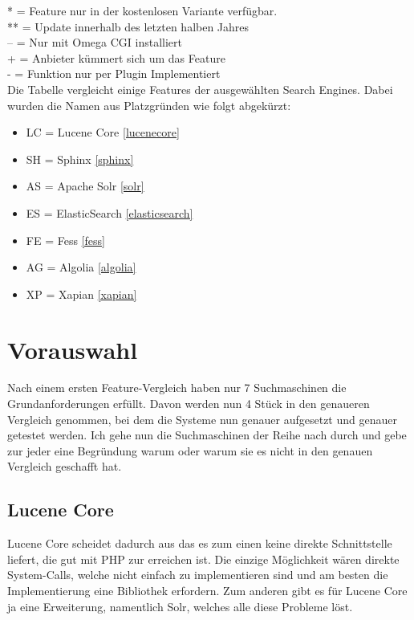 \begin{table}
    *  = Feature nur in der kostenlosen Variante verfügbar. \\
    ** = Update innerhalb des letzten halben Jahres \\
    -- = Nur mit Omega CGI installiert \\
    +  = Anbieter kümmert sich um das Feature \\
    -  = Funktion nur per Plugin Implementiert \\

    Die Tabelle vergleicht einige Features der ausgewählten Search Engines. Dabei wurden die Namen aus Platzgründen wie folgt abgekürzt:

    \begin{itemize}
        \item LC = Lucene Core \ref{lucenecore}
        \item SH = Sphinx \ref{sphinx}
        \item AS = Apache Solr \ref{solr}
        \item ES = ElasticSearch \ref{elasticsearch}
        \item FE = Fess \ref{fess}
        \item AG = Algolia \ref{algolia}
        \item XP = Xapian \ref{xapian}
    \end{itemize} 


\end{table}

\section{Vorauswahl}

Nach einem ersten Feature-Vergleich haben nur 7 Suchmaschinen die Grundanforderungen erfüllt. Davon werden nun 4 Stück in den genaueren Vergleich genommen, bei dem die Systeme nun genauer aufgesetzt und genauer getestet werden. Ich gehe nun die Suchmaschinen der Reihe nach durch und gebe zur jeder eine Begründung warum oder warum sie es nicht in den genauen Vergleich geschafft hat.

\subsection{Lucene Core}

Lucene Core scheidet dadurch aus das es zum einen keine direkte Schnittstelle liefert, die gut mit PHP zur erreichen ist. Die einzige Möglichkeit wären direkte System-Calls, welche nicht einfach zu implementieren sind und am besten die Implementierung eine Bibliothek erfordern. Zum anderen gibt es für Lucene Core ja eine Erweiterung, namentlich Solr, welches alle diese Probleme löst. \cite{TheApacheSoftwareFoundation.2019b}

